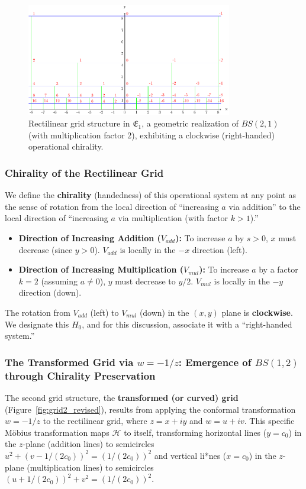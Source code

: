 \begin{figure}[ht]
\centering
\includegraphics[width=0.8\textwidth]{images/01-grid-example-1.pdf}
\caption{Rectilinear grid structure in $\mathfrak{E}_1$, a geometric realization of $BS(2,1)$ (with multiplication factor 2), exhibiting a clockwise (right-handed) operational chirality.}\label{fig:grid1_revised}
\end{figure}

\subsubsection{Chirality of the Rectilinear Grid}
We define the \textbf{chirality} (handedness) of this operational system at any point as the sense of rotation from the local direction of ``increasing $a$ via addition'' to the local direction of ``increasing $a$ via multiplication (with factor $k>1$).''
\begin{itemize}
    \item \textbf{Direction of Increasing Addition ($V_{add}$):} To increase $a$ by $s>0$, $x$ must decrease (since $y>0$). $V_{add}$ is locally in the $-x$ direction (left).
    \item \textbf{Direction of Increasing Multiplication ($V_{mul}$):} To increase $a$ by a factor $k=2$ (assuming $a \neq 0$), $y$ must decrease to $y/2$. $V_{mul}$ is locally in the $-y$ direction (down).
\end{itemize}
The rotation from $V_{add}$ (left) to $V_{mul}$ (down) in the $(x,y)$ plane is \textbf{clockwise}. We designate this $H_0$, and for this discussion, associate it with a ``right-handed system.''

\subsubsection{The Transformed Grid via $w = -1/z$: Emergence of $BS(1,2)$ through Chirality Preservation}
The second grid structure, the \textbf{transformed (or curved) grid} (Figure~\ref{fig:grid2_revised}), results from applying the conformal transformation $w = -1/z$ to the rectilinear grid, where $z=x+iy$ and $w=u+iv$. %
This specific M\"obius transformation maps $\mathcal{H}$ to itself, transforming horizontal lines ($y=c_0$) in the $z$-plane (addition lines) to semicircles $u^2 + (v - 1/(2c_0))^2 = (1/(2c_0))^2$ and vertical li*nes ($x=c_0$) in the $z$-plane (multiplication lines) to semicircles $(u + 1/(2c_0))^2 + v^2 = (1/(2c_0))^2$.


